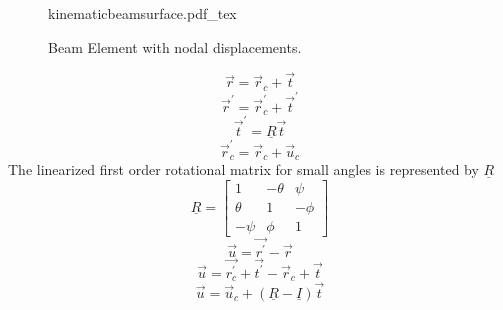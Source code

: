 \begin{figure}
	\centering
	\def\svgwidth{400pt}
	{kinematicbeamsurface.pdf_tex}
	\caption{Beam Element with nodal displacements.}
	\label{fig:KineBeamElem}
\end{figure}
\begin{equation}\label{eq:r}
\vec{r}=\vec{r}_c+\vec{t}
\end{equation}
\begin{equation}\label{eq:rprime}
\vec{r}^\prime=\vec{r}_c^\prime+\vec{t}^\prime
\end{equation}
\begin{equation}\label{eq:trot}
\vec{t}^\prime=\underline{R}\vec{t}
\end{equation}
\begin{equation}\label{eq:rtrans}
\vec{r}_c^\prime=\vec{r}_c+\vec{u}_c
\end{equation}
The linearized first order rotational matrix for small angles is represented by $\underline{R}$
\begin{equation}\label{eq:RotTransformation}
\underline{R}=\left[\begin{array}{ccc}
1&-\theta&\psi\\
\theta&1&-\phi\\
-\psi&\phi&1
\end{array}\right]
\end{equation}
\begin{equation}\label{eq:DispVectorrpr}
\vec{u}=\vec{r^\prime}-\vec{r}
\end{equation}
\begin{equation}\label{eq:DispVectorrptprt}
\vec{u}=\vec{r_c^\prime}+\vec{t^\prime}-\vec{r}_c+\vec{t}
\end{equation}
\begin{equation}\label{eq:DispVectRotTranst}
\vec{u}=\vec{u}_c+(\underline{R}-\underline{I})\vec{t}
\end{equation}
